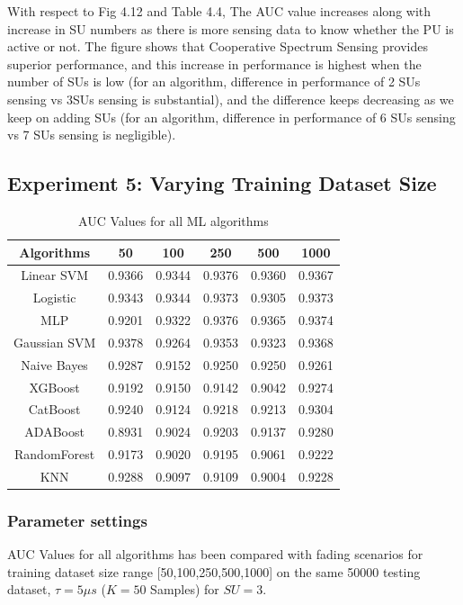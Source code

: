 With respect to Fig 4.12 and Table 4.4,  The AUC value increases along with increase in SU numbers as there is more sensing data to know whether the PU is active or not. The figure shows that Cooperative Spectrum Sensing provides superior performance, and this increase in performance is highest when the number of SUs is low (for an algorithm, difference in performance of 2 SUs sensing vs 3SUs sensing is substantial), and the difference keeps decreasing as we keep on adding SUs (for an algorithm, difference in performance of 6 SUs sensing vs 7 SUs sensing is negligible).


\subsection{Experiment 5: Varying Training Dataset Size}

\begin{table}
\centering
\caption{AUC Values for all ML algorithms}
    \begin{tabular}{||c c c c c c ||}
    \hline
    {\bf Algorithms} & {\bf 50} & {\bf 100} & {\bf 250} & {\bf 500} & {\bf 1000}\\ \hline
    
    	Linear SVM 	& 0.9366	& 0.9344	& 0.9376	& 0.9360	& 0.9367	\\ \hline
  	Logistic 		& 0.9343	& 0.9344	& 0.9373	& 0.9305	& 0.9373	\\ \hline
  	MLP 			& 0.9201	& 0.9322	& 0.9376	& 0.9365	& 0.9374	\\ \hline
  	Gaussian SVM 	& 0.9378	& 0.9264	& 0.9353	& 0.9323	& 0.9368	\\ \hline
  	Naive Bayes 	& 0.9287	& 0.9152	& 0.9250	& 0.9250	& 0.9261	\\ \hline
  	XGBoost 		& 0.9192	& 0.9150	& 0.9142	& 0.9042	& 0.9274	\\ \hline
  	CatBoost 		& 0.9240	& 0.9124	& 0.9218	& 0.9213	& 0.9304	\\ \hline
  	ADABoost 		& 0.8931	& 0.9024	& 0.9203	& 0.9137	& 0.9280	\\ \hline
  	RandomForest 	& 0.9173	& 0.9020	& 0.9195	& 0.9061	& 0.9222	\\ \hline
  	KNN 			& 0.9288	& 0.9097	& 0.9109	& 0.9004	& 0.9228	\\ \hline
	\end{tabular}
\end{table} 

\subsubsection{Parameter settings}
AUC Values for all algorithms has been compared with fading scenarios for training dataset size range [50,100,250,500,1000] on the same 50000 testing dataset, $\tau=5\mu s$ ($K=50$ Samples) for $SU=3$.


